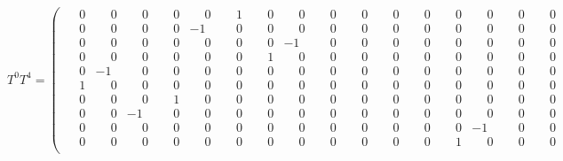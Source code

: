 \documentclass[10pt]{article}
\begin{document}
\[
T^{0}T^{4} = \left(\begin{smallmatrix}
\phantom{-}0 & \phantom{-}0 & \phantom{-}0 & \phantom{-}0 & \phantom{-}0 & \phantom{-}1 & \phantom{-}0 & \phantom{-}0 & \phantom{-}0 & \phantom{-}0 & \phantom{-}0 & \phantom{-}0 & \phantom{-}0 & \phantom{-}0 & \phantom{-}0 & \phantom{-}0 \\
\phantom{-}0 & \phantom{-}0 & \phantom{-}0 & \phantom{-}0 & -1 & \phantom{-}0 & \phantom{-}0 & \phantom{-}0 & \phantom{-}0 & \phantom{-}0 & \phantom{-}0 & \phantom{-}0 & \phantom{-}0 & \phantom{-}0 & \phantom{-}0 & \phantom{-}0 \\
\phantom{-}0 & \phantom{-}0 & \phantom{-}0 & \phantom{-}0 & \phantom{-}0 & \phantom{-}0 & \phantom{-}0 & -1 & \phantom{-}0 & \phantom{-}0 & \phantom{-}0 & \phantom{-}0 & \phantom{-}0 & \phantom{-}0 & \phantom{-}0 & \phantom{-}0 \\
\phantom{-}0 & \phantom{-}0 & \phantom{-}0 & \phantom{-}0 & \phantom{-}0 & \phantom{-}0 & \phantom{-}1 & \phantom{-}0 & \phantom{-}0 & \phantom{-}0 & \phantom{-}0 & \phantom{-}0 & \phantom{-}0 & \phantom{-}0 & \phantom{-}0 & \phantom{-}0 \\
\phantom{-}0 & -1 & \phantom{-}0 & \phantom{-}0 & \phantom{-}0 & \phantom{-}0 & \phantom{-}0 & \phantom{-}0 & \phantom{-}0 & \phantom{-}0 & \phantom{-}0 & \phantom{-}0 & \phantom{-}0 & \phantom{-}0 & \phantom{-}0 & \phantom{-}0 \\
\phantom{-}1 & \phantom{-}0 & \phantom{-}0 & \phantom{-}0 & \phantom{-}0 & \phantom{-}0 & \phantom{-}0 & \phantom{-}0 & \phantom{-}0 & \phantom{-}0 & \phantom{-}0 & \phantom{-}0 & \phantom{-}0 & \phantom{-}0 & \phantom{-}0 & \phantom{-}0 \\
\phantom{-}0 & \phantom{-}0 & \phantom{-}0 & \phantom{-}1 & \phantom{-}0 & \phantom{-}0 & \phantom{-}0 & \phantom{-}0 & \phantom{-}0 & \phantom{-}0 & \phantom{-}0 & \phantom{-}0 & \phantom{-}0 & \phantom{-}0 & \phantom{-}0 & \phantom{-}0 \\
\phantom{-}0 & \phantom{-}0 & -1 & \phantom{-}0 & \phantom{-}0 & \phantom{-}0 & \phantom{-}0 & \phantom{-}0 & \phantom{-}0 & \phantom{-}0 & \phantom{-}0 & \phantom{-}0 & \phantom{-}0 & \phantom{-}0 & \phantom{-}0 & \phantom{-}0 \\
\phantom{-}0 & \phantom{-}0 & \phantom{-}0 & \phantom{-}0 & \phantom{-}0 & \phantom{-}0 & \phantom{-}0 & \phantom{-}0 & \phantom{-}0 & \phantom{-}0 & \phantom{-}0 & \phantom{-}0 & \phantom{-}0 & -1 & \phantom{-}0 & \phantom{-}0 \\
\phantom{-}0 & \phantom{-}0 & \phantom{-}0 & \phantom{-}0 & \phantom{-}0 & \phantom{-}0 & \phantom{-}0 & \phantom{-}0 & \phantom{-}0 & \phantom{-}0 & \phantom{-}0 & \phantom{-}0 & \phantom{-}1 & \phantom{-}0 & \phantom{-}0 & \phantom{-}0 \\

\end{smallmatrix}\]
\end{document}
